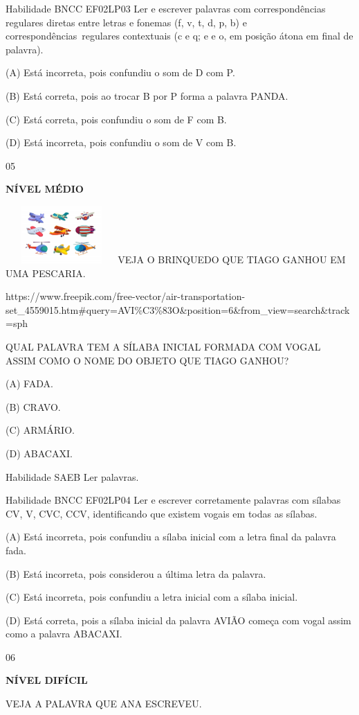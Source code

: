 {{Habilidade BNCC EF02LP03 Ler e escrever palavras com correspondências
regulares diretas entre letras e fonemas (f, v, t, d, p, b) e
correspondências~regulares contextuais (c e q; e e o, em posição átona
em final de palavra).

(A) Está incorreta, pois confundiu o som de D com P.

(B) Está correta, pois ao trocar B por P forma a palavra PANDA.

(C) Está correta, pois confundiu o som de F com B.

(D) Está incorreta, pois confundiu o som de V com B.

\num{05}

\textbf{NÍVEL MÉDIO}

\includegraphics[width=1.69097in,height=0.86538in]{media/image177.jpeg}VEJA
O BRINQUEDO QUE TIAGO GANHOU EM UMA PESCARIA.

https://www.freepik.com/free-vector/air-transportation-set\_4559015.htm\#query=AVI\%C3\%83O\&position=6\&from\_view=search\&track=sph

QUAL PALAVRA TEM A SÍLABA INICIAL FORMADA COM VOGAL ASSIM COMO O NOME DO
OBJETO QUE TIAGO GANHOU?

(A) FADA.

(B) CRAVO.

(C) ARMÁRIO.

(D) ABACAXI.

Habilidade SAEB Ler palavras.

Habilidade BNCC EF02LP04 Ler e escrever corretamente palavras com
sílabas CV, V, CVC, CCV, identificando que existem vogais em todas as
sílabas.

(A) Está incorreta, pois confundiu a sílaba inicial com a letra final da
palavra fada.

(B) Está incorreta, pois considerou a última letra da palavra.

(C) Está incorreta, pois confundiu a letra inicial com a sílaba inicial.

(D) Está correta, pois a sílaba inicial da palavra AVIÃO começa com
vogal assim como a palavra ABACAXI.

\num{06}

\textbf{NÍVEL DIFÍCIL}

VEJA A PALAVRA QUE ANA ESCREVEU.

}}
